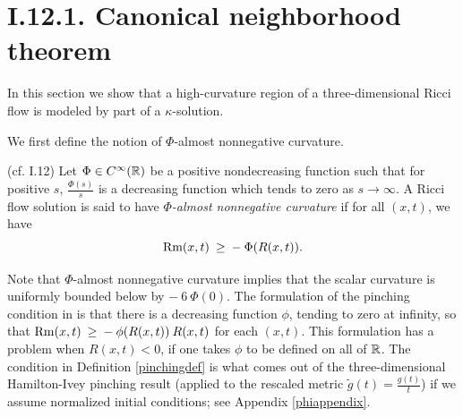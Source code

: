 \section{I.12.1. Canonical neighborhood theorem}
\label{I.12.1}

In this section we show that a high-curvature region of a three-dimensional
Ricci flow is modeled by part of a $\kappa$-solution.


We first define the notion of $\Phi$-almost nonnegative curvature.

\begin{definition}
  \label{def:kl-canonical-neighborhood-theorem-almost-nonnegative-curvature}
 (cf. I.12) \label{pinchingdef}
Let $\Phi \in C^\infty({\mathbb R})$ be a positive nondecreasing function
such that
for positive $s$, $\frac{\Phi(s)}{s}$ is a decreasing function which
tends to zero as $s \rightarrow \infty$.
A Ricci flow solution is said to have {\em $\Phi$-almost nonnegative
curvature} if for all $(x,t)$, we have
\begin{equation} \label{phieqnn}
\operatorname{Rm}(x,t) \: \ge \: - \: \Phi(R(x,t)).
\end{equation}
\end{definition}

\begin{remark}
  \label{rem:kl-canonical-neighborhood-theorem-existence-canonical-neighborhoods}

Note that $\Phi$-almost nonnegative curvature implies that the scalar curvature is uniformly
bounded below by $- \: 6 \: \Phi(0)$.
The formulation of the pinching condition in \cite[Section 12]{Perelman}
is that there is a decreasing function $\phi$, tending to zero at infinity,
so that $\operatorname{Rm}(x,t) \: \ge \: - \: \phi(R(x,t)) \: R(x,t)$ for each
$(x,t)$. This formulation has a problem when $R(x,t) < 0$, if one
takes $\phi$ to be defined on all of ${\mathbb R}$. The condition in
Definition \ref{pinchingdef} is what comes out of the
three-dimensional
Hamilton-Ivey pinching result (applied to the rescaled metric
$\tilde{g}(t) = \frac{g(t)}{t}$) if we assume normalized initial
conditions; see Appendix \ref{phiappendix}.
\end{remark}

